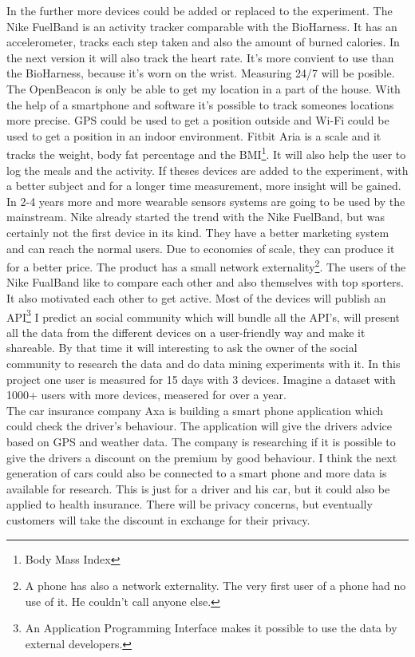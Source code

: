 	In the further more devices could be added or replaced to the experiment. The Nike FuelBand\cite{fuelband} is an activity tracker comparable with the BioHarness. It has an accelerometer, tracks each step taken and also the amount of burned calories. In the next version it will also track the heart rate\cite{fuelband2}. It's more convient to use than the BioHarness, because it's worn on the wrist. Measuring 24/7 will be posible. The OpenBeacon is only be able to get my location in a part of the house. With the help of a smartphone and software it's possible to track someones locations more precise. GPS could be used to get a position outside and Wi-Fi could be used to get a position in an indoor environment\cite{Howard-2003-283}. Fitbit Aria\cite{aria} is a scale and it tracks the weight, body fat percentage and the BMI\footnote{Body Mass Index}. It will also help the user to log the meals and the activity. If theses devices are added to the experiment, with a better subject and for a longer time measurement, more insight will be gained.
	\\
	In 2-4 years more and more wearable sensors systems are going to be used by the mainstream. Nike already started the trend with the Nike FuelBand, but was certainly not the first device in its kind. They have a better marketing system and can reach the normal users. Due to economies of scale, they can produce it for a better price. The product has a small network externality\footnote{A phone has also a network externality. The very first user of a phone had no use of it. He couldn't call anyone else.}. The users of the Nike FualBand like to compare each other and also themselves with top sporters. It also motivated each other to get active. Most of the devices will publish an API\footnote{An Application Programming Interface makes it possible to use the data by external developers.} I predict an social community which will bundle all the API's, will present all the data from the different devices on a user-friendly way and make it shareable. By that time it will interesting to ask the owner of the social community to research the data and do data mining experiments with it. In this project one user is measured for 15 days with 3 devices. Imagine a dataset with 1000+ users with more devices, measered for over a year.
	\\	
	The car insurance company Axa is building a smart phone application which could check the driver's behaviour\cite{axa}. The application will give the drivers advice based on GPS and weather data. The company is researching if it is possible to give the drivers a discount on the premium by good behaviour. I think the next generation of cars could also be connected to a smart phone and more data is available for research. This is just for a driver and his car, but it could also be applied to health insurance. There will be privacy concerns, but eventually customers will take the discount in exchange for their privacy. 
